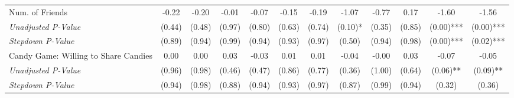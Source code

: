 \begin{tabular}{l c c c c c c c c c c c}
Num. of Friends & -0.22 & -0.20 & -0.01 & -0.07 & -0.15 & -0.19 & -1.07 & -0.77 & 0.17 & -1.60 & -1.56 \\
\quad \textit{Unadjusted P-Value} & (0.44) & (0.48) & (0.97) & (0.80) & (0.63) & (0.74) & (0.10)* & (0.35) & (0.85) & (0.00)*** & (0.00)*** \\
\quad \textit{Stepdown P-Value} & (0.89) & (0.94) & (0.99) & (0.94) & (0.93) & (0.97) & (0.50) & (0.94) & (0.98) & (0.00)*** & (0.02)*** \\
Candy Game: Willing to Share Candies & 0.00 & 0.00 & 0.03 & -0.03 & 0.01 & 0.01 & -0.04 & -0.00 & 0.03 & -0.07 & -0.05 \\
\quad \textit{Unadjusted P-Value} & (0.96) & (0.98) & (0.46) & (0.47) & (0.86) & (0.77) & (0.36) & (1.00) & (0.64) & (0.06)** & (0.09)** \\
\quad \textit{Stepdown P-Value} & (0.94) & (0.98) & (0.88) & (0.94) & (0.93) & (0.97) & (0.87) & (0.99) & (0.94) & (0.32) & (0.36) \\
\bottomrule
\end{tabular}
